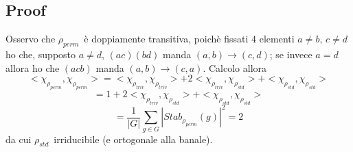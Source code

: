 \documentclass[]{article}
\def\ros{$\rho_{std}$}
\def\rop{$\rho_{perm}$}
\begin{document}
\subsection{Proof}
Osservo che \rop\, è doppiamente transitiva, poichè fissati 4 elementi $a\neq b,\, c\neq d$ ho che, supposto $a\neq d$, $(ac)(bd)$ manda $(a,b)\rightarrow (c, d)$; se invece $a=d$ allora ho che $(acb)$ manda $(a,b)\rightarrow(c,a)$. Calcolo allora
\[<\chi_{\rho_{perm}}, \chi_{\rho_{perm}}> = <\chi_{\rho_{triv}}, \chi_{\rho_{triv}}> + 2<\chi_{\rho_{triv}}, \chi_{\rho_{std}}> + <\chi_{\rho_{std}}, \chi_{\rho_{std}}>\]
\[=  1 + 2<\chi_{\rho_{triv}}, \chi_{\rho_{std}}> + <\chi_{\rho_{std}}, \chi_{\rho_{std}}>\]
\[= \dfrac{1}{|G|} \sum_{g\in G} |Stab_{\rho_{perm}} (g)|^2 = 2\]
da cui \ros\, irriducibile (e ortogonale alla banale).
\end{document}
